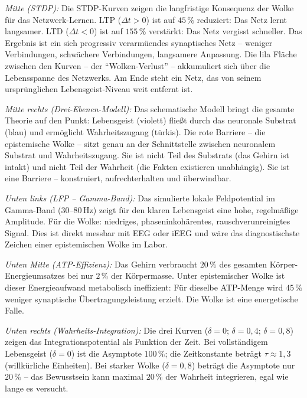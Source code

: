 ﻿\documentclass[12pt,a4paper]{report}
\theoremstyle{plain}
\theoremstyle{definition}
\theoremstyle{remark}
\begin{document}
	\textit{Mitte (STDP):}
	Die STDP-Kurven zeigen die langfristige Konsequenz der Wolke für das
	Netzwerk-Lernen. LTP ($\Delta t > 0$) ist auf $45\,\%$ reduziert:
	Das Netz lernt langsamer. LTD ($\Delta t < 0$) ist auf $155\,\%$ verstärkt:
	Das Netz vergisst schneller. Das Ergebnis ist ein sich progressiv
	verarmüendes synaptisches Netz -- weniger Verbindungen, schwächere
	Verbindungen, langsamere Anpassung.
	Die lila Fläche zwischen den Kurven -- der ``Wolken-Verlust'' --
	akkumuliert sich über die Lebensspanne des Netzwerks. Am Ende
	steht ein Netz, das von seinem ursprünglichen Lebensgeist-Niveau
	weit entfernt ist.

	\textit{Mitte rechts (Drei-Ebenen-Modell):}
	Das schematische Modell bringt die gesamte Theorie auf den Punkt:
	Lebensgeist (violett) flie\ss{}t durch das neuronale Substrat (blau)
	und ermöglicht Wahrheitszugang (türkis). Die rote Barriere --
	die epistemische Wolke -- sitzt genau an der Schnittstelle zwischen
	neuronalem Substrat und Wahrheitszugang. Sie ist nicht Teil des Substrats
	(das Gehirn ist intakt) und nicht Teil der Wahrheit (die Fakten existieren
	unabhängig). Sie ist eine Barriere -- konstruiert, aufrechterhalten
	und überwindbar.

	\textit{Unten links (LFP -- Gamma-Band):}
	Das simulierte lokale Feldpotential im Gamma-Band ($30$--$80$\,Hz)
	zeigt für den klaren Lebensgeist eine hohe, regelmä\ss{}ige Amplitude.
	Für die Wolke: niedriges, phaseninkohärentes, rauschverunreinigtes Signal.
	Dies ist direkt messbar mit EEG oder iEEG und wäre das diagnostischste
	Zeichen einer epistemischen Wolke im Labor.

	\textit{Unten Mitte (ATP-Effizienz):}
	Das Gehirn verbraucht $20\,\%$ des gesamten Körper-Energie\-umsatzes
	bei nur $2\,\%$ der Körpermasse. Unter epistemischer Wolke ist dieser
	Energieaufwand metabolisch ineffizient: Für dieselbe ATP-Menge
	wird $45\,\%$ weniger synaptische Übertragungsleistung erzielt.
	Die Wolke ist eine energetische Falle.

	\textit{Unten rechts (Wahrheits-Integration):}
	Die drei Kurven ($\delta = 0$; $\delta = 0{,}4$; $\delta = 0{,}8$)
	zeigen das Integrationspotential als Funktion der Zeit.
	Bei vollständigem Lebensgeist ($\delta = 0$) ist die Asymptote $100\,\%$;
	die Zeitkonstante beträgt $\tau \approx 1{,}3$ (willkürliche Einheiten).
	Bei starker Wolke ($\delta = 0{,}8$) beträgt die Asymptote nur $20\,\%$ --
	das Bewusstsein kann maximal $20\,\%$ der Wahrheit integrieren,
	egal wie lange es versucht.
	
\end{document}
